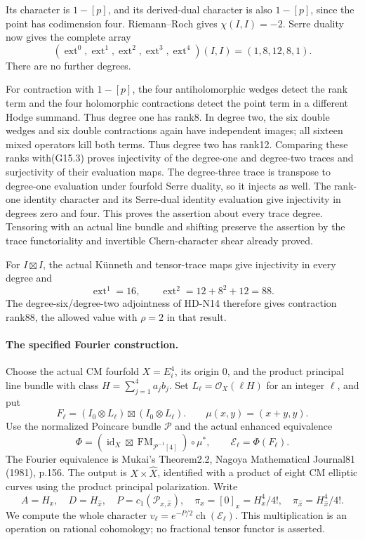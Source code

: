 Its character is $1-[p]$, and its derived-dual character
is also $1-[p]$, since the point has codimension four.
Riemann--Roch gives $\chi(I,I)=-2$. Serre duality now gives
the complete array
\[
       (\operatorname{ext}^0,\operatorname{ext}^1,
          \operatorname{ext}^2,\operatorname{ext}^3,
          \operatorname{ext}^4)(I,I)=(1,8,12,8,1).
                                                               \tag{G15.3}
\]
There are no further degrees.

For contraction with $1-[p]$, the four antiholomorphic
wedges detect the rank term and the four holomorphic
contractions detect the point term in a different Hodge
summand. Thus degree one has rank8. In degree two, the
six double wedges and six double contractions again
have independent images; all sixteen mixed operators
kill both terms. Thus degree two has rank12.
Comparing these ranks with(G15.3) proves injectivity of
the degree-one and degree-two traces and surjectivity
of their evaluation maps. The degree-three trace is
transpose to degree-one evaluation under fourfold
Serre duality, so it injects as well. The rank-one
identity character and its Serre-dual identity
evaluation give injectivity in degrees zero and four.
This proves the assertion about every trace degree.
Tensoring with an actual line bundle and shifting
preserve the assertion by the trace functoriality
and invertible Chern-character shear already proved.

For $I\boxtimes I$, the actual K\"unneth and tensor-trace
maps give injectivity in every degree and
\[
       \operatorname{ext}^1=16,\qquad
       \operatorname{ext}^2=12+8^2+12=88.                 \tag{G15.4}
\]
The degree-six/degree-two adjointness of HD-N14 therefore
gives contraction rank88, the allowed value with
$\rho=2$ in that result.

\paragraph{The specified Fourier construction.}
Choose the actual CM fourfold $X=E_i^4$, its origin $0$,
and the product principal line bundle with class
$H=\sum_{j=1}^4a_jb_j$. Set $L_\ell=\mathcal O_X(\ell H)$
for an integer $\ell$, and put
\[
 F_\ell=(I_0\otimes L_\ell)\boxtimes(I_0\otimes L_\ell).
 \qquad
 \mu(x,y)=(x+y,y).
\]
Use the normalized Poincare bundle $\mathcal P$ and the
actual enhanced equivalence
\[
 \Phi=(\operatorname{id}_X\boxtimes
                 \operatorname{FM}_{\mathcal P^{-1}[4]})\circ\mu^*,
 \qquad \mathcal E_\ell=\Phi(F_\ell).
                                                               \tag{G15.5}
\]
The Fourier equivalence is Mukai's Theorem2.2,
Nagoya Mathematical Journal81 (1981), p.156.
The output is $X\times\widehat X$, identified with a product
of eight CM elliptic curves using the product principal
polarization. Write
\[
 A=H_x,\quad D=H_{\widehat x},\quad
 P=c_1(\mathcal P_{x,\widehat x}),\quad
 \pi_x=[0]_x=H_x^4/4!,\quad
 \pi_{\widehat x}=H_{\widehat x}^4/4!.
\]
We compute the whole character
$v_\ell=e^{-P/2}\operatorname{ch}(\mathcal E_\ell)$.
This multiplication is an operation on rational cohomology;
no fractional tensor functor is asserted.

